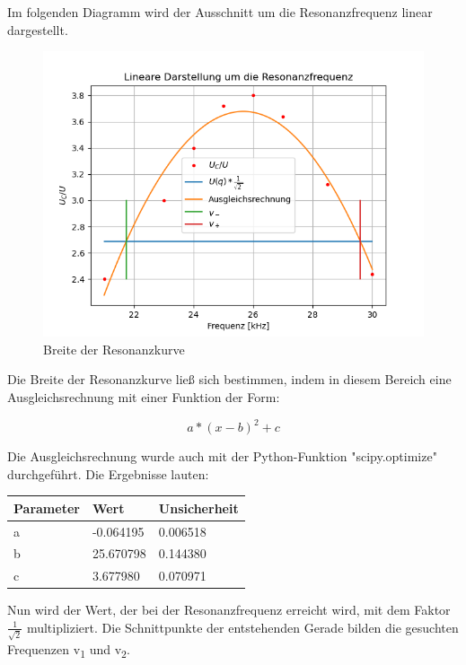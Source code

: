 \documentclass[titlepage=firstcover, captions=tableheading]{scrartcl}
\begin{document}
\noindent Im folgenden Diagramm wird der Ausschnitt um die Resonanzfrequenz linear dargestellt.

\begin{figure}[H]
    \includegraphics{5c2.png}
    \caption{Breite der Resonanzkurve}
    \label{5cD}
\end{figure}

\noindent Die Breite der Resonanzkurve ließ sich bestimmen, indem in diesem Bereich eine Ausgleichsrechnung mit einer Funktion der Form:

\begin{displaymath}
    a*(x-b)^2+c
\end{displaymath}

\noindent Die Ausgleichsrechnung wurde auch mit der Python-Funktion "scipy.optimize" durchgeführt.
Die Ergebnisse lauten:

\begin{center}
\begin{tabular}{ll@{${}\pm{}$}l}
    \toprule
    Parameter & Wert & Unsicherheit\\
    \midrule
    a & -0.064195 & 0.006518 \\
    b & 25.670798 & 0.144380 \\
    c & 3.677980 & 0.070971 \\
    \bottomrule
    
\end{tabular}
\end{center}

\noindent Nun wird der Wert, der bei der Resonanzfrequenz erreicht wird, mit dem Faktor $\frac{1}{\sqrt{2}}$ multipliziert.
Die Schnittpunkte der entstehenden Gerade bilden die gesuchten Frequenzen v\textsubscript{1} und v\textsubscript{2}.
\end{document}
